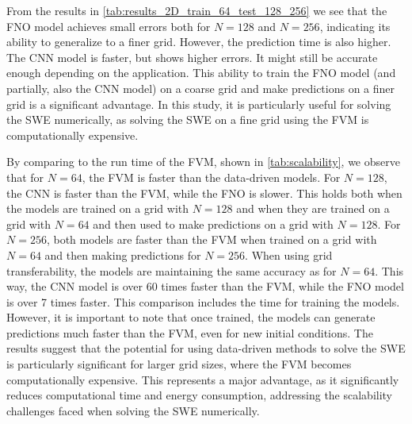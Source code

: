 From the results in \autoref{tab:results_2D_train_64_test_128_256} we see that the FNO model achieves small errors both for $N = 128$ and $N = 256$, indicating its ability to generalize to a finer grid.
However, the prediction time is also higher.
The CNN model is faster, but shows higher errors.
It might still be accurate enough depending on the application.
This ability to train the FNO model (and partially, also the CNN model) on a coarse grid and make predictions on a finer grid is a significant advantage.
In this study, it is particularly useful for solving the SWE numerically, as solving the SWE on a fine grid using the FVM is computationally expensive.

By comparing to the run time of the FVM, shown in \autoref{tab:scalability}, we observe that for $N = 64$, the FVM is faster than the data-driven models.
For $N = 128$, the CNN is faster than the FVM, while the FNO is slower.
This holds both when the models are trained on a grid with $N = 128$ and when they are trained on a grid with $N = 64$ and then used to make predictions on a grid with $N = 128$.
For $N = 256$, both models are faster than the FVM when trained on a grid with $N = 64$ and then making predictions for $N = 256$.
When using grid transferability, the models are maintaining the same accuracy as for $N = 64$.
This way, the CNN model is over 60 times faster than the FVM, while the FNO model is over 7 times faster.
This comparison includes the time for training the models.
However, it is important to note that once trained, the models can generate predictions much faster than the FVM, even for new initial conditions.
The results suggest that the potential for using data-driven methods to solve the SWE is particularly significant for larger grid sizes, where the FVM becomes computationally expensive.
This represents a major advantage, as it significantly reduces computational time and energy consumption, addressing the scalability challenges faced when solving the SWE numerically.


